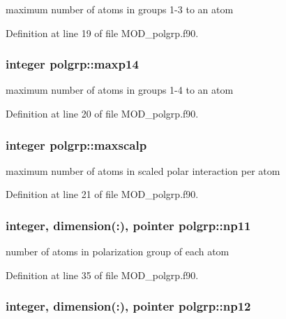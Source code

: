 maximum number of atoms in groups 1-\/3 to an atom 



Definition at line 19 of file M\-O\-D\-\_\-polgrp.\-f90.

\hypertarget{classpolgrp_a2febf4fbf3f6284c93120f4af3659844}{
\subsubsection[{maxp14}]{\setlength{\rightskip}{0pt plus 5cm}integer polgrp\-::maxp14}}\label{classpolgrp_a2febf4fbf3f6284c93120f4af3659844}


maximum number of atoms in groups 1-\/4 to an atom 



Definition at line 20 of file M\-O\-D\-\_\-polgrp.\-f90.

\hypertarget{classpolgrp_ac72b886208bc9efbeccf87e9b6f99c0f}{
\subsubsection[{maxscalp}]{\setlength{\rightskip}{0pt plus 5cm}integer polgrp\-::maxscalp}}\label{classpolgrp_ac72b886208bc9efbeccf87e9b6f99c0f}


maximum number of atoms in scaled polar interaction per atom 



Definition at line 21 of file M\-O\-D\-\_\-polgrp.\-f90.

\hypertarget{classpolgrp_a92496ef9d82dc1881a591033a76c032f}{
\subsubsection[{np11}]{\setlength{\rightskip}{0pt plus 5cm}integer, dimension(\-:), pointer polgrp\-::np11}}\label{classpolgrp_a92496ef9d82dc1881a591033a76c032f}


number of atoms in polarization group of each atom 



Definition at line 35 of file M\-O\-D\-\_\-polgrp.\-f90.

\hypertarget{classpolgrp_a18263501dbc8502c7daaaaeb6de004fc}{
\subsubsection[{np12}]{\setlength{\rightskip}{0pt plus 5cm}integer, dimension(\-:), pointer polgrp\-::np12}}\label{classpolgrp_a18263501dbc8502c7daaaaeb6de004fc}


